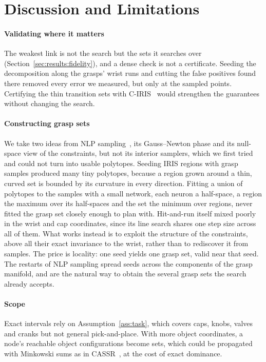 \section{Discussion and Limitations}
\label{sec:discussion}

\paragraph{Validating where it matters}
The weakest link is not the search but the sets it searches over
(Section~\ref{sec:results:fidelity}), and a dense check is not a certificate.
Seeding the decomposition along the grasps' wrist runs and cutting the false
positives found there removed every error we measured, but only at the
sampled points. Certifying the thin transition sets with
C-IRIS~\cite{dai2024certified} would strengthen the guarantees without
changing the search.

\paragraph{Constructing grasp sets}
We take two ideas from NLP sampling~\cite{toussaint2024nlp}, its
Gauss--Newton phase and its null-space view of the constraints, but not its
interior samplers, which we first tried and could not turn into usable
polytopes. Seeding IRIS regions with grasp samples produced many tiny
polytopes, because a region grown around a thin, curved set is bounded by its
curvature in every direction. Fitting a union of polytopes to the samples with
a small network, each neuron a half-space, a region the maximum over its
half-spaces and the set the minimum over regions, never fitted the grasp set
closely enough to plan with. Hit-and-run itself mixed poorly in the wrist and
cap coordinates, since its line search shares one step size across all of
them. What works instead is to exploit the structure of the constraints, above
all their exact invariance to the wrist, rather than to rediscover it from
samples. The price is locality: one seed yields one grasp set, valid near that
seed. The restarts of NLP sampling spread seeds across the components of the
grasp manifold, and are the natural way to obtain the several grasp sets the
search already accepts. 

\paragraph{Scope}
Exact intervals rely on Assumption~\ref{ass:task}, which covers caps, knobs,
valves and cranks but not general pick-and-place. With more object
coordinates, a node's reachable object configurations become sets, which could
be propagated with Minkowski sums as in CASSR~\cite{wang2026cassr}, at the
cost of exact dominance.

